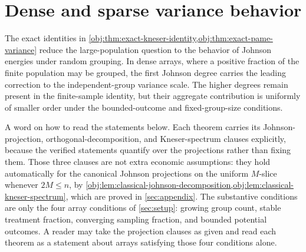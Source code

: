 \section{Dense and sparse variance behavior}\label{sec:dense-sparse}

The exact identities in \cref{obj:thm:exact-kneser-identity,obj:thm:exact-pame-variance} reduce the large-population question to the behavior of Johnson energies under random grouping. In dense arrays, where a positive fraction of the finite population may be grouped, the first Johnson degree carries the leading correction to the independent-group variance scale. The higher degrees remain present in the finite-sample identity, but their aggregate contribution is uniformly of smaller order under the bounded-outcome and fixed-group-size conditions.

A word on how to read the statements below. Each theorem carries its Johnson-projection, orthogonal-decomposition, and Kneser-spectrum clauses explicitly, because the verified statements quantify over the projections rather than fixing them. Those three clauses are not extra economic assumptions: they hold automatically for the canonical Johnson projections on the uniform \(M\)-slice whenever \(2M\le n\), by \cref{obj:lem:classical-johnson-decomposition,obj:lem:classical-kneser-spectrum}, which are proved in \cref{sec:appendix}. The substantive conditions are only the four array conditions of \cref{sec:setup}: growing group count, stable treatment fraction, converging sampling fraction, and bounded potential outcomes. A reader may take the projection clauses as given and read each theorem as a statement about arrays satisfying those four conditions alone.

